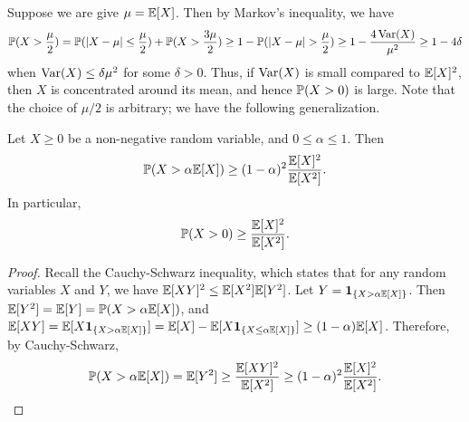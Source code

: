 Suppose we are give $\mu = \mathbb{E}[X]$. Then by Markov's inequality, we have
\begin{align}
    \mathbb{P}(X > \frac{\mu}{2}) = \mathbb{P}(\left| X-\mu \right| \leq \frac{\mu}{2}) + \mathbb{P}(X > \frac{3 \mu}{2}) \geq 1 - \mathbb{P}(\left| X-\mu \right| > \frac{\mu}{2}) \geq 1 - \frac{4\operatorname{Var}(X)}{\mu^{2}} \geq 1-4\delta
\end{align}
when $\operatorname{Var}(X) \leq \delta \mu^{2}$ for some $\delta > 0$. Thus, if $\operatorname{Var}(X)$ is small compared to $\mathbb{E}[X]^{2}$, then $X$ is concentrated around its mean, and hence $\mathbb{P}(X > 0)$ is large. Note that the choice of $\mu/2$ is arbitrary; we have the following generalization.
\begin{lemma}
    Let $X \geq 0$ be a non-negative random variable, and $0 \leq \alpha \leq 1$. Then
    \begin{align}
        \mathbb{P}(X > \alpha \mathbb{E}[X]) \geq (1-\alpha)^{2} \frac{\mathbb{E}[X]^{2}}{\mathbb{E}[X^{2}]}.
    \end{align}
    In particular,
    \begin{align}
        \mathbb{P}(X > 0) \geq \frac{\mathbb{E}[X]^{2}}{\mathbb{E}[X^{2}]}.
    \end{align}
\end{lemma}
\begin{proof}
    Recall the Cauchy-Schwarz inequality, which states that for any random variables $X$ and $Y$, we have $\mathbb{E}[XY]^{2} \leq \mathbb{E}[X^{2}]\mathbb{E}[Y^{2}]$. Let $Y = \textbf{1}_{\{X > \alpha \mathbb{E}[X]\}}$. Then $\mathbb{E}[Y^{2}] = \mathbb{E}[Y] = \mathbb{P}(X > \alpha \mathbb{E}[X])$, and $\mathbb{E}[XY] = \mathbb{E}[X\textbf{1}_{\{X > \alpha \mathbb{E}[X]\}}] = \mathbb{E}[X] - \mathbb{E}[X\textbf{1}_{\{X \leq \alpha \mathbb{E}[X]\}}] \geq (1-\alpha)\mathbb{E}[X]$. Therefore, by Cauchy-Schwarz,
    \begin{align}
        \mathbb{P}(X > \alpha \mathbb{E}[X]) = \mathbb{E}[Y^{2}] \geq \frac{\mathbb{E}[XY]^{2}}{\mathbb{E}[X^{2}]} \geq (1-\alpha)^{2} \frac{\mathbb{E}[X]^{2}}{\mathbb{E}[X^{2}]}.
    \end{align}
\end{proof}

